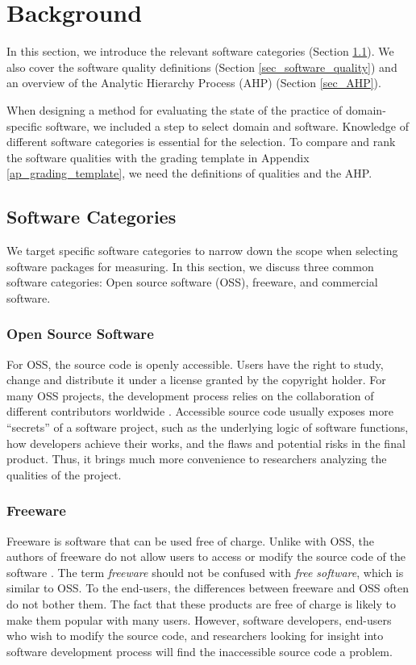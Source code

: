 \chapter{Background}
\label{ch_background}

In this section, we introduce the relevant software categories (Section \ref{sec_software_categories}). We also cover the software quality definitions (Section \ref{sec_software_quality}) and an overview of the Analytic Hierarchy Process (AHP) (Section \ref{sec_AHP}).

When designing a method for evaluating the state of the practice of domain-specific software, we included a step to select domain and software. Knowledge of different software categories is essential for the selection. To compare and rank the software qualities with the grading template in Appendix \ref{ap_grading_template}, we need the definitions of qualities and the AHP.

\section{Software Categories}
\label{sec_software_categories}
We target specific software categories to narrow down the scope when selecting software packages for measuring. In this section, we discuss three common software categories: Open source software (OSS), freeware, and commercial software.

\subsection{Open Source Software}
\label{sec_open_source_software}
For OSS, the source code is openly accessible. Users have the right to study, change and distribute it under a license granted by the copyright holder. For many OSS projects, the development process relies on the collaboration of different contributors worldwide \cite{Corbly2014}. Accessible source code usually exposes more ``secrets'' of a software project, such as the underlying logic of software functions, how developers achieve their works, and the flaws and potential risks in the final product. Thus, it brings much more convenience to researchers analyzing the qualities of the project.

\subsection{Freeware}
\label{sec_freeware}
Freeware is software that can be used free of charge. Unlike with OSS, the authors of freeware do not allow users to access or modify the source code of the software \cite{LINFO2006}. The term \textit{freeware} should not be confused with \textit{free software}, which is similar to OSS. To the end-users, the differences between freeware and OSS often do not bother them. The fact that these products are free of charge is likely to make them popular with many users. However, software developers, end-users who wish to modify the source code, and researchers looking for insight into software development process will find the inaccessible source code a problem. 

